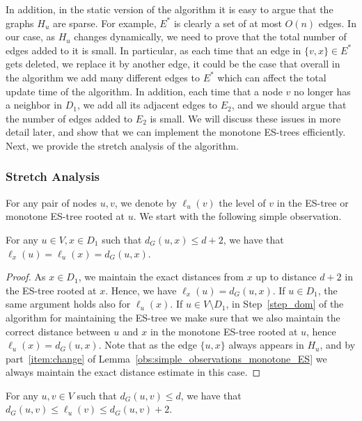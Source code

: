 In addition, in the static version of the algorithm it is easy to argue that the graphs $H_u$ are sparse. For example, $E^*$ is clearly a set of at most $O(n)$ edges. In our case, as $H_u$ changes dynamically, we need to prove that the total number of edges added to it is small.
In particular, as each time that an edge in $\{v,x\} \in E^*$ gets deleted, we replace it by another edge, it could be the case that overall in the algorithm we add many different edges to $E^*$ which can affect the total update time of the algorithm. In addition, each time that a node $v$ no longer has a neighbor in $D_1$, we add all its adjacent edges to $E_2$, and we should argue that the number of edges added to $E_2$ is small.
We will discuss these issues in more detail later, and show that we can implement the monotone ES-trees efficiently. 
Next, we provide the stretch analysis of the algorithm.

\subsubsection{Stretch Analysis} \label{sec:add_warmup_stretch} %
For any pair of nodes $u,v$, we denote by $\ell_u(v)$ the level of $v$ in the ES-tree or monotone ES-tree rooted at $u$. We start with the following simple observation. 
\begin{claim}\label{obs:stretch_warmup}
For any $u \in V, x \in D_1$ such that $d_G(u,x) \leq d+2$, we have that $\ell_x(u)=\ell_u(x)=d_G(u,x).$
\end{claim} 

\begin{proof}
As $x \in D_1$, we maintain the exact distances from $x$ up to distance $d+2$ in the ES-tree rooted at $x$. Hence, we have $\ell_x(u)=d_G(u,x)$. If $u \in D_1$, the same argument holds also for $\ell_u(x)$. If $u \in V \setminus D_1$, in Step~\ref{step_dom} of the algorithm for maintaining the ES-tree we make sure that we also maintain the correct distance between $u$ and $x$ in the monotone ES-tree rooted at $u$, hence $\ell_u(x)=d_G(u,x)$. Note that as the edge $\{u,x\}$ always appears in $H_u$, and by part~\ref{item:change} of Lemma~\ref{obs:simple_observations_monotone_ES} we always maintain the exact distance estimate in this case.
\end{proof}


\begin{claim}\label{claim:stretch_warmup}
For any $u,v \in V$ such that $d_G(u,v) \leq d$, we have that $d_G(u,v) \leq \ell_u(v) \leq d_G(u,v) +2.$
\end{claim}

